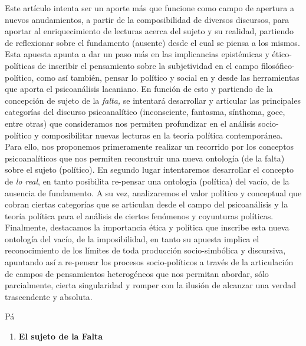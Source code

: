 Este artículo intenta ser un aporte más que funcione como campo de apertura a nuevos anudamientos, a partir de la composibilidad de diversos discursos, para aportar al enriquecimiento de lecturas acerca del sujeto y su realidad, partiendo de reflexionar sobre el fundamento (ausente) desde el cual se piensa a los mismos. Esta apuesta apunta a dar un paso más en las implicancias epistémicas y ético-políticas de inscribir el pensamiento sobre la subjetividad en el campo filosófico-político, como así también, pensar lo político y social en y desde las herramientas que aporta el psicoanálisis lacaniano. En función de esto y partiendo de la concepción de sujeto de la \emph{falta, }se intentará desarrollar y articular las principales categorías del discurso psicoanalítico (inconsciente, fantasma, sínthoma, goce, entre otras) que consideramos nos permiten profundizar en el análisis socio-político y composibilitar nuevas lecturas en la teoría política contemporánea. Para ello, nos proponemos primeramente realizar un recorrido por los conceptos psicoanalíticos que nos permiten reconstruir una nueva ontología (de la falta) sobre el sujeto (político). En segundo lugar intentaremos desarrollar el concepto de \emph{lo real}, en tanto posibilita re-pensar una ontología (política) del vacío, de la ausencia de fundamento. A su vez, analizaremos el valor político y conceptual que cobran ciertas categorías que se articulan desde el campo del psicoanálisis y la teoría política para el análisis de ciertos fenómenos y coyunturas políticas. Finalmente, destacamos la importancia ética y política que inscribe esta nueva ontología del vacío, de la imposibilidad, en tanto su apuesta implica el reconocimiento de los límites de toda producción socio-simbólica y discursiva, apuntando así a re-pensar los procesos socio-políticos a través de la articulación de campos de pensamientos heterogéneos que nos permitan abordar, sólo parcialmente, cierta singularidad y romper con la ilusión de alcanzar una verdad trascendente y absoluta.

Pá

\begin{enumerate}
\def\labelenumi{\arabic{enumi}.}
\item
  \textbf{El sujeto de la Falta}
\end{enumerate}

